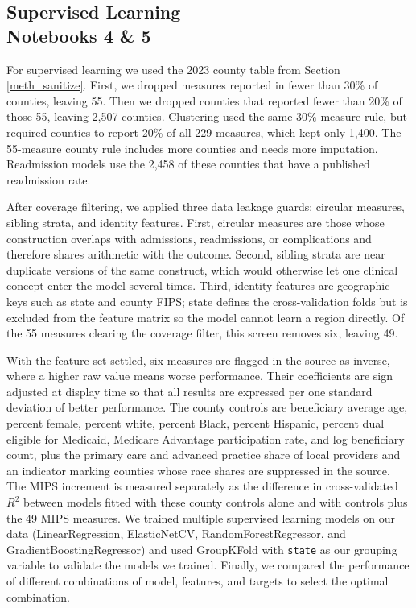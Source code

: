 \documentclass[12pt]{article}
\begin{document}
\subsection[Supervised Learning]{Supervised Learning \\ \small{Notebooks 4 \& 5}} \label{meth_sup}
For supervised learning we used the 2023 county table from Section \ref{meth_sanitize}. First, we dropped measures reported in fewer than 30\% of counties, leaving 55. Then we dropped counties that reported fewer than 20\% of those 55, leaving 2,507 counties. Clustering used the same 30\% measure rule, but required counties to report 20\% of all 229 measures, which kept only 1,400. The 55-measure county rule includes more counties and needs more imputation. Readmission models use the 2,458 of these counties that have a published readmission rate.

After coverage filtering, we applied three data leakage guards: circular measures, sibling strata, and identity features. First, circular measures are those whose construction overlaps with admissions, readmissions, or complications and therefore shares arithmetic with the outcome. Second, sibling strata are near duplicate versions of the same construct, which would otherwise let one clinical concept enter the model several times. Third, identity features are geographic keys such as state and county FIPS; state defines the cross-validation folds but is excluded from the feature matrix so the model cannot learn a region directly. Of the 55 measures clearing the coverage filter, this screen removes six, leaving 49.

With the feature set settled, six measures are flagged in the source as inverse, where a higher raw value means worse performance. Their coefficients are sign adjusted at display time so that all results are expressed per one standard deviation of better performance. The county controls are beneficiary average age, percent female, percent white, percent Black, percent Hispanic, percent dual eligible for Medicaid, Medicare Advantage participation rate, and log beneficiary count, plus the primary care and advanced practice share of local providers and an indicator marking counties whose race shares are suppressed in the source. The MIPS increment is measured separately as the difference in cross-validated $R^2$ between models fitted with these county controls alone and with controls plus the 49 MIPS measures. We trained multiple supervised learning models on our data (LinearRegression, ElasticNetCV, RandomForestRegressor, and GradientBoostingRegressor) and used GroupKFold with \texttt{state} as our grouping variable to validate the models we trained. Finally, we compared the performance of different combinations of model, features, and targets to select the optimal combination.
\end{document}
